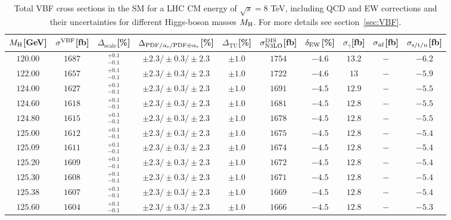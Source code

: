 \begin{table}[ht]
\caption{Total VBF cross sections in the SM for a LHC CM energy of $\sqrt{s}=8$ TeV, including QCD and EW corrections
and their uncertainties for different Higgs-boson masses $M_\mathrm{H}$. For more details see section~\ref{sec:VBF}.}
\label{tab:vbf_XStot_8}
\begin{center}%
\begin{small}%
\begin{tabular}{cccccccc|cc}%
\toprule
$M_\mathrm{H}$[GeV] & $\sigma^{\mathrm{VBF}}$[fb] & $\Delta_{\mathrm{scale}}$[\%] & $\Delta_{\mathrm{PDF}/\alpha_{\mathrm{s}}/\mathrm{PDF\oplus\alpha_{\mathrm{s}}}}$[\%] & $\Delta_{\mathrm{TU}}$[\%] &
$\sigma_{\mathrm{N3LO}}^{\mathrm{DIS}}$[fb] & $\delta_{\mathrm{EW}}$[\%] & $\sigma_{\gamma}$[fb] & $\sigma_{\mbox{\scriptsize nf}}$[fb] & $\sigma_{\mbox{\scriptsize s/t/u}}$[fb]
\\
\midrule
$120.00$ & $1687$ & $^{+0.1}_{-0.1}$ & $\pm 2.3/\pm 0.3/\pm 2.3$ & $\pm 1.0$ & $1754$ & $-4.6$ & $13.2$ & $-$ & $-6.2$ \\
$122.00$ & $1657$ & $^{+0.1}_{-0.1}$ & $\pm 2.3/\pm 0.3/\pm 2.3$ & $\pm 1.0$ & $1722$ & $-4.6$ & $13  $ & $-$ & $-5.9$ \\
$124.00$ & $1627$ & $^{+0.1}_{-0.1}$ & $\pm 2.3/\pm 0.3/\pm 2.3$ & $\pm 1.0$ & $1691$ & $-4.5$ & $12.9$ & $-$ & $-5.5$ \\
$124.60$ & $1618$ & $^{+0.1}_{-0.1}$ & $\pm 2.3/\pm 0.3/\pm 2.3$ & $\pm 1.0$ & $1681$ & $-4.5$ & $12.8$ & $-$ & $-5.5$ \\
$124.80$ & $1615$ & $^{+0.1}_{-0.1}$ & $\pm 2.3/\pm 0.3/\pm 2.3$ & $\pm 1.0$ & $1678$ & $-4.5$ & $12.8$ & $-$ & $-5.5$ \\
$125.00$ & $1612$ & $^{+0.1}_{-0.1}$ & $\pm 2.3/\pm 0.3/\pm 2.3$ & $\pm 1.0$ & $1675$ & $-4.5$ & $12.8$ & $-$ & $-5.4$ \\
$125.09$ & $1611$ & $^{+0.1}_{-0.1}$ & $\pm 2.3/\pm 0.3/\pm 2.3$ & $\pm 1.0$ & $1674$ & $-4.5$ & $12.8$ & $-$ & $-5.4$ \\
$125.20$ & $1609$ & $^{+0.1}_{-0.1}$ & $\pm 2.3/\pm 0.3/\pm 2.3$ & $\pm 1.0$ & $1672$ & $-4.5$ & $12.8$ & $-$ & $-5.4$ \\
$125.30$ & $1608$ & $^{+0.1}_{-0.1}$ & $\pm 2.3/\pm 0.3/\pm 2.3$ & $\pm 1.0$ & $1671$ & $-4.5$ & $12.8$ & $-$ & $-5.4$ \\
$125.38$ & $1607$ & $^{+0.1}_{-0.1}$ & $\pm 2.3/\pm 0.3/\pm 2.3$ & $\pm 1.0$ & $1669$ & $-4.5$ & $12.8$ & $-$ & $-5.4$ \\
$125.60$ & $1604$ & $^{+0.1}_{-0.1}$ & $\pm 2.3/\pm 0.3/\pm 2.3$ & $\pm 1.0$ & $1666$ & $-4.5$ & $12.8$ & $-$ & $-5.3$ \\

\end{tabular}
\end{small}
\end{center}
\end{table}
